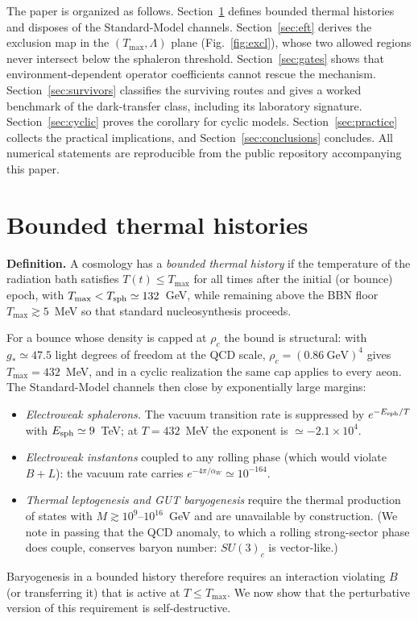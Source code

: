 \documentclass[12pt,a4paper]{article}
\begin{document}
The paper is organized as follows.  Section~\ref{sec:bounded} defines
bounded thermal histories and disposes of the Standard-Model channels.
Section~\ref{sec:eft} derives the exclusion map in the
$(T_{\max},\Lambda)$ plane (Fig.~\ref{fig:excl}), whose two allowed
regions never intersect below the sphaleron threshold.
Section~\ref{sec:gates} shows that environment-dependent operator
coefficients cannot rescue the mechanism.  Section~\ref{sec:survivors}
classifies the surviving routes and gives a worked benchmark of the
dark-transfer class, including its laboratory signature.
Section~\ref{sec:cyclic} proves the corollary for cyclic models.
Section~\ref{sec:practice} collects the practical implications, and
Section~\ref{sec:conclusions} concludes.  All numerical statements are
reproducible from the public repository accompanying this paper.

\section{Bounded thermal histories}
\label{sec:bounded}

\noindent\textbf{Definition.}  A cosmology has a \emph{bounded thermal
history} if the temperature of the radiation bath satisfies
$T(t)\le T_{\max}$ for all times after the initial (or bounce) epoch,
with $T_{\max}<T_{\rm sph}\simeq132$~GeV, while remaining above the BBN
floor $T_{\max}\gtrsim5$~MeV so that standard nucleosynthesis proceeds.

For a bounce whose density is capped at $\rho_{c}$ the bound is
structural: with $g_{*}\simeq47.5$ light degrees of freedom at the QCD
scale, $\rho_{c}=(0.86~\text{GeV})^{4}$ gives $T_{\max}=432$~MeV, and in
a cyclic realization the same cap applies to every aeon.  The
Standard-Model channels then close by exponentially large margins:
\begin{itemize}
\item \emph{Electroweak sphalerons.}  The vacuum transition rate is
suppressed by $e^{-E_{\rm sph}/T}$ with $E_{\rm sph}\simeq9$~TeV; at
$T=432$~MeV the exponent is $\simeq-2.1\times10^{4}$.
\item \emph{Electroweak instantons} coupled to any rolling phase
(which would violate $B+L$): the vacuum rate carries
$e^{-4\pi/\alpha_{W}}\simeq10^{-164}$.
\item \emph{Thermal leptogenesis and GUT baryogenesis} require the
thermal production of states with $M\gtrsim10^{9}$--$10^{16}$~GeV and
are unavailable by construction.  (We note in passing that the QCD
anomaly, to which a rolling strong-sector phase does couple, conserves
baryon number: $SU(3)_{c}$ is vector-like.)
\end{itemize}
Baryogenesis in a bounded history therefore requires an interaction
violating $B$ (or transferring it) that is active at
$T\le T_{\max}$.  We now show that the perturbative version of this
requirement is self-destructive.
\end{document}
